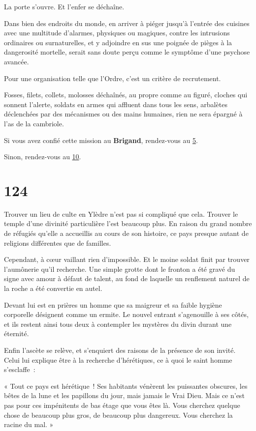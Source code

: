 \documentclass{report}
\newcommand{\gsection}[1]{
    \section{#1}
    \label{section-#1}
}
\newcommand{\glink}[1]{\hyperref[section-#1]{#1}}
\newcommand{\hero}[1]{\textbf{#1}}
\begin{document}
La porte s'ouvre. Et l'enfer se déchaîne.

Dans bien des endroits du monde, en arriver à piéger jusqu'à l'entrée des cuisines avec une multitude d'alarmes, physiques ou magiques, contre les intrusions ordinaires ou surnaturelles, et y adjoindre en sus une poignée de pièges à la dangerosité mortelle, serait sans doute perçu comme le symptôme d'une psychose avancée.

Pour une organisation telle que l'Ordre, c'est un critère de recrutement.

Fosses, filets, collets, molosses déchaînés, au propre comme au figuré, cloches qui sonnent l'alerte, soldats en armes qui affluent dans tous les sens, arbalètes déclenchées par des mécanismes ou des mains humaines, rien ne sera épargné à l'as de la cambriole.

Si vous avez confié cette mission au \hero{Brigand}, rendez-vous au \glink{5}.

Sinon, rendez-vous au \glink{10}.

\gsection{124}

Trouver un lieu de culte en Ylèdre n'est pas si compliqué que cela. Trouver le temple d'une divinité particulière l'est beaucoup plus. En raison du grand nombre de réfugiés qu'elle a accueillis au cours de son histoire, ce pays presque autant de religions différentes que de familles.

Cependant, à cœur vaillant rien d'impossible. Et le moine soldat finit par trouver l'aumônerie qu'il recherche. Une simple grotte dont le fronton a été gravé du signe avec amour à défaut de talent, au fond de laquelle un renflement naturel de la roche a été convertie en autel.

Devant lui est en prières un homme que sa maigreur et sa faible hygiène corporelle désignent comme un ermite. Le nouvel entrant s'agenouille à ses côtés, et ils restent ainsi tous deux à contempler les mystères du divin durant une éternité.

Enfin l'ascète se relève, et s'enquiert des raisons de la présence de son invité. Celui lui explique être à la recherche d'hérétiques, ce à quoi le saint homme s'esclaffe :

« Tout ce pays est hérétique ! Ses habitants vénèrent les puissantes obscures, les bêtes de la lune et les papillons du jour, mais jamais le Vrai Dieu. Mais ce n'est pas pour ces impénitents de bas étage que vous êtes là. Vous cherchez quelque chose de beaucoup plus gros, de beaucoup plus dangereux. Vous cherchez la racine du mal. »
\end{document}
